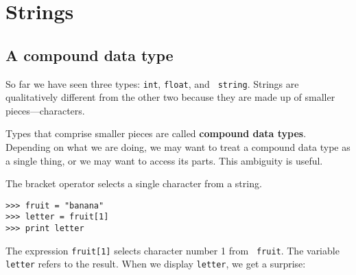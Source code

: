 

\chapter{Strings}
\label{strings}


\section{A compound data type}

So far we have seen three types: {\tt int}, {\tt float}, and {\tt
string}.  Strings are qualitatively different from the
other two because they are made up of smaller pieces---characters.


Types that comprise smaller pieces are called {\bf compound data
types}.  Depending on what we are doing, we may want to treat a
compound data type as a single thing, or we may want to access its
parts.  This ambiguity is useful.


The bracket operator selects a single character from a string.

\beforeverb
\begin{verbatim}
>>> fruit = "banana"
>>> letter = fruit[1]
>>> print letter
\end{verbatim}
\afterverb
%
The expression {\tt fruit[1]} selects character number 1 from {\tt
fruit}.  The variable {\tt letter} refers to the result.  When we
display {\tt letter}, we get a surprise:

